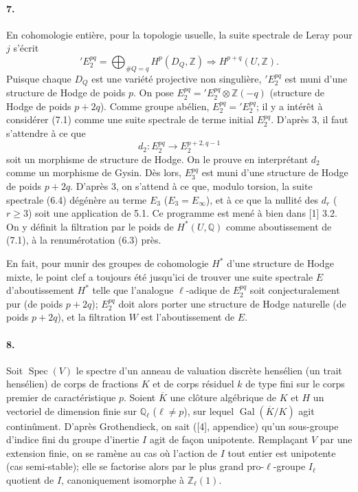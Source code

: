 \documentclass[10pt]{article}
\newcommand{\Q}{\mathbb Q}
\newcommand{\Z}{\mathbb Z}
\newcommand{\Ql}{\mathbb Q_\ell}
\newcommand{\Zl}{\mathbb Z_\ell}
\newcommand{\Gal}{\operatorname{Gal}}
\newcommand{\Spec}{\operatorname{Spec}}
\newcommand{\barK}{\overline{K}}
\begin{document}
\paragraph{7.} En cohomologie entière, pour la topologie usuelle, la suite spectrale de Leray pour $j$ s'écrit
\[
\tag{7.1}
{}'E_2^{pq}=\bigoplus_{\#Q=q}H^p(D_Q,\Z)\Rightarrow H^{p+q}(U,\Z).
\]
Puisque chaque $D_Q$ est une variété projective non singulière, ${}'E_2^{pq}$ est muni d'une structure de Hodge de poids $p$. On pose $E_2^{pq}={}'E_2^{pq}\otimes\Z(-q)$ (structure de Hodge de poids $p+2q$). Comme groupe abélien, $E_2^{pq}={}'E_2^{pq}$; il y a intérêt à considérer (7.1) comme une suite spectrale de terme initial $E_2^{pq}$. D'après 3, il faut s'attendre à ce que
\[
d_2:E_2^{pq}\to E_2^{p+2,q-1}
\]
soit un morphisme de structure de Hodge. On le prouve en interprétant $d_2$ comme un morphisme de Gysin. Dès lors, $E_3^{pq}$ est muni d'une structure de Hodge de poids $p+2q$. D'après 3, on s'attend à ce que, modulo torsion, la suite spectrale (6.4) dégénère au terme $E_3$ ($E_3=E_\infty$), et à ce que la nullité des $d_r$ ($r\ge3$) soit une application de 5.1. Ce programme est mené à bien dans [1] 3.2. On y définit la filtration par le poids de $H^*(U,\Q)$ comme aboutissement de (7.1), à la renumérotation (6.3) près.

En fait, pour munir des groupes de cohomologie $H^*$ d'une structure de Hodge mixte, le point clef a toujours été jusqu'ici de trouver une suite spectrale $E$ d'aboutissement $H^*$ telle que l'analogue $\ell$-adique de $E_2^{pq}$ soit conjecturalement pur (de poids $p+2q$); $E_2^{pq}$ doit alors porter une structure de Hodge naturelle (de poids $p+2q$), et la filtration $W$ est l'aboutissement de $E$.

\paragraph{8.} Soit $\Spec(V)$ le spectre d'un anneau de valuation discrète hensélien (un trait hensélien) de corps de fractions $K$ et de corps résiduel $k$ de type fini sur le corps premier de caractéristique $p$. Soient $\barK$ une clôture algébrique de $K$ et $H$ un vectoriel de dimension finie sur $\Ql$ ($\ell\ne p$), sur lequel $\Gal(\barK/K)$ agit continûment. D'après Grothendieck, on sait ([4], appendice) qu'un sous-groupe d'indice fini du groupe d'inertie $I$ agit de façon unipotente. Remplaçant $V$ par une extension finie, on se ramène au cas où l'action de $I$ tout entier est unipotente (cas semi-stable); elle se factorise alors par le plus grand pro-$\ell$-groupe $I_\ell$ quotient de $I$, canoniquement isomorphe à $\Zl(1)$.
\end{document}
